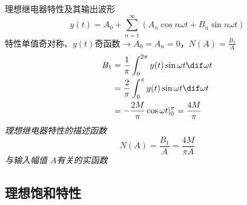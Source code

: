 \documentclass[handout,cjkutf8,table,aspectratio=1610]{beamer} %
\begin{document}
\begin{frame}{理想继电器特性及其输出波形}
	$$y(t)=A_0+\sum_{n=1}^\infty(A_n\cos n\omega t+B_n\sin n\omega t)$$
	特性单值奇对称、$y(t)$奇函数$\rightarrow A_0=A_n=0$，$N(A)=\frac{B_1}{A}$
	\begin{align*}
		B_1	&= \frac{1}{\pi}\int_0^{2\pi}y(t)\sin\omega t\dif \omega t\\
			&= \frac{2}{\pi}\int_0^{\pi}y(t)\sin\omega t\dif\omega t\\
			&= -\frac{2M}{\pi}\cos\omega t|_0^\pi=\frac{4M}{\pi}
	\end{align*}
	\emph{理想继电器特性的描述函数}
	$$N(A)=\frac{B_1}{A}=\frac{4M}{\pi A}$$
	\emph{与输入幅值 $A$有关的实函数}
\end{frame}

\subsection{理想饱和特性}
\end{document}
